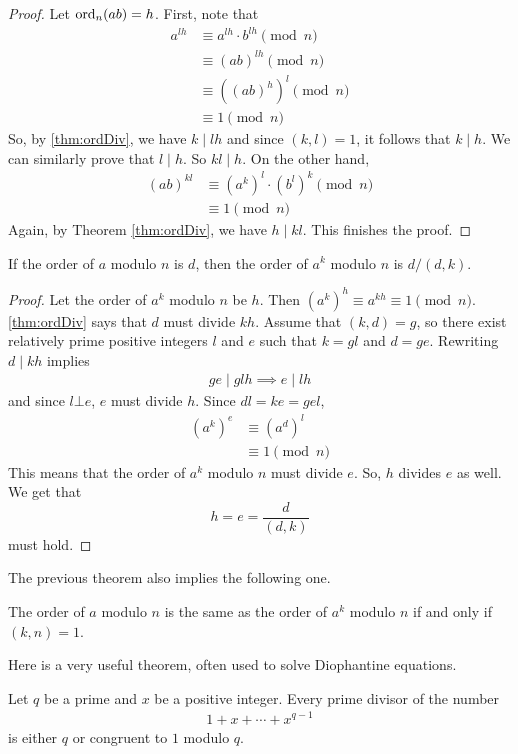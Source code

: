 \begin{proof}
	Let $\operatorname{ord}_n(ab)=h$. First, note that
		\begin{align*}
			a^{lh}
				& \equiv a^{lh}\cdot b^{lh}\pmod{n}\\
				& \equiv (ab)^{lh}\pmod{n}\\
				& \equiv \left((ab)^h\right)^l\pmod{n}\\
				& \equiv 1 \pmod n
		\end{align*}
	So, by \autoref{thm:ordDiv}, we have $k\mid lh$ and since $(k,l)=1$, it follows that $k\mid h$. We can similarly prove that $l\mid h$. So $kl\mid h$. On the other hand,
		\begin{align*}
			(ab)^{kl}
				& \equiv (a^k)^l \cdot (b^l)^k\pmod{n}\\
				& \equiv 1 \pmod n
		\end{align*}
	Again, by Theorem \eqref{thm:ordDiv}, we have $h\mid kl$. This finishes the proof.
\end{proof}

\begin{theorem}
	If the order of $a$ modulo $n$ is $d$, then the order of $a^k$ modulo $n$ is $d/{(d,k)}$.
\end{theorem}

\begin{proof}
	Let the order of $a^k$ modulo $n$ be $h$. Then $\left(a^k\right)^h \equiv a^{kh} \equiv 1\pmod n$. \autoref{thm:ordDiv} says that $d$ must divide $kh$. Assume that $(k,d)=g$, so there exist relatively prime positive integers $l$ and $e$ such that $k=gl$ and $d=ge$. Rewriting $d \mid  kh$ implies
		\begin{align*}
			ge\mid glh \implies e\mid lh
		\end{align*}
	and since $l\bot e$, $e$ must divide $h$. Since $dl=ke=gel$,
		\begin{align*}
			\left(a^k\right)^{e}
				& \equiv \left(a^d\right)^{l}\\
				& \equiv 1\pmod n
		\end{align*}
	This means that the order of $a^k$ modulo $n$ must divide $e$. So, $h$ divides $e$ as well. We get that $$h=e=\dfrac{d}{(d,k)}$$ must hold.
\end{proof}
The previous theorem also implies the following one.
\begin{theorem}
	The order of $a$ modulo $n$ is the same as the order of $a^k$ modulo $n$ if and only if $(k,n)=1$.
\end{theorem}
Here is a very useful theorem, often used to solve Diophantine equations.
\begin{theorem}\label{thm:cyclodiv}
	Let $q$ be a prime and $x$ be a positive integer. Every prime divisor of the number
		\begin{align*}
			1+x+\cdots+x^{q-1}
		\end{align*}
	is either $q$ or congruent to $1$ modulo $q$.
\end{theorem}

